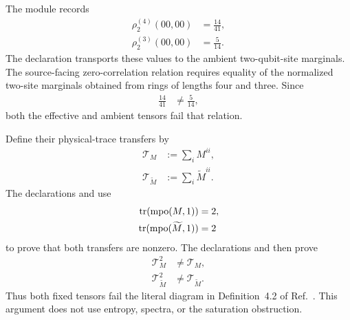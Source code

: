 \documentclass{article}
\begin{document}
The module  records
\begin{align}
    \rho^{(4)}_2(00,00)
        &= \frac{14}{41},
    \label{eq:cpsv16_examples_4_10_4_11_entropy_example411_ring_four_entry}\\
    \rho^{(3)}_2(00,00)
        &= \frac{5}{14}.
    \label{eq:cpsv16_examples_4_10_4_11_entropy_example411_ring_three_entry}
\end{align}
The declaration
transports these values to the ambient two-qubit-site marginals. The
source-facing zero-correlation relation requires equality of the normalized
two-site marginals obtained from rings of lengths four and three. Since
\begin{align}
    \frac{14}{41}
        &\ne \frac{5}{14},
    \label{eq:cpsv16_examples_4_10_4_11_entropy_example411_marginal_mismatch}
\end{align}
both the effective and ambient tensors fail that relation.

Define their physical-trace transfers by
\begin{align}
    \mathcal T_M
        &:= \sum_i M^{ii},
    \label{eq:cpsv16_examples_4_10_4_11_entropy_example411_effective_transfer}\\
    \mathcal T_{\widetilde M}
        &:= \sum_i \widetilde M^{ii}.
    \label{eq:cpsv16_examples_4_10_4_11_entropy_example411_ambient_transfer}
\end{align}
The declarations
 and
 use
\begin{align}
    \operatorname{tr}(\operatorname{mpo}(M,1))
        &= 2,
    \label{eq:cpsv16_examples_4_10_4_11_entropy_example411_effective_one_site_trace}\\
    \operatorname{tr}(\operatorname{mpo}(\widetilde M,1))
        &= 2
    \label{eq:cpsv16_examples_4_10_4_11_entropy_example411_ambient_one_site_trace}
\end{align}
to prove that both transfers are nonzero. The declarations
and
then prove
\begin{align}
    \mathcal T_M^2
        &\ne \mathcal T_M,
    \label{eq:cpsv16_examples_4_10_4_11_entropy_example411_effective_nonidempotence}\\
    \mathcal T_{\widetilde M}^2
        &\ne \mathcal T_{\widetilde M}.
    \label{eq:cpsv16_examples_4_10_4_11_entropy_example411_ambient_nonidempotence}
\end{align}
Thus both fixed tensors fail the literal diagram in Definition~4.2 of
Ref.~\cite[lines~735--739]{Cirac2016MPDO_arXiv}. This argument does not use
entropy, spectra, or the saturation obstruction.
\end{document}
